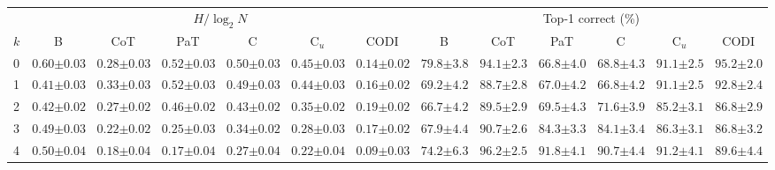 \begin{table}[!t]
\centering
\tiny
\setlength{\tabcolsep}{3pt}
\begin{tabular}{l cccccc cccccc}
\toprule
 & \multicolumn{6}{c}{$H/\log_2 N$} & \multicolumn{6}{c}{Top-1 correct (\%)} \\
\cmidrule(lr){2-7} \cmidrule(lr){8-13}
$k$ & B & CoT & PaT & C & C$_u$ & CODI & B & CoT & PaT & C & C$_u$ & CODI \\
\midrule
0 & $0.60 {\scriptstyle \pm 0.03}$ & $0.28 {\scriptstyle \pm 0.03}$ & $0.52 {\scriptstyle \pm 0.03}$ & $0.50 {\scriptstyle \pm 0.03}$ & $0.45 {\scriptstyle \pm 0.03}$ & $0.14 {\scriptstyle \pm 0.02}$ & $79.8 {\scriptstyle \pm 3.8}$ & $94.1 {\scriptstyle \pm 2.3}$ & $66.8 {\scriptstyle \pm 4.0}$ & $68.8 {\scriptstyle \pm 4.3}$ & $91.1 {\scriptstyle \pm 2.5}$ & $95.2 {\scriptstyle \pm 2.0}$ \\
1 & $0.41 {\scriptstyle \pm 0.03}$ & $0.33 {\scriptstyle \pm 0.03}$ & $0.52 {\scriptstyle \pm 0.03}$ & $0.49 {\scriptstyle \pm 0.03}$ & $0.44 {\scriptstyle \pm 0.03}$ & $0.16 {\scriptstyle \pm 0.02}$ & $69.2 {\scriptstyle \pm 4.2}$ & $88.7 {\scriptstyle \pm 2.8}$ & $67.0 {\scriptstyle \pm 4.2}$ & $66.8 {\scriptstyle \pm 4.2}$ & $91.1 {\scriptstyle \pm 2.5}$ & $92.8 {\scriptstyle \pm 2.4}$ \\
2 & $0.42 {\scriptstyle \pm 0.02}$ & $0.27 {\scriptstyle \pm 0.02}$ & $0.46 {\scriptstyle \pm 0.02}$ & $0.43 {\scriptstyle \pm 0.02}$ & $0.35 {\scriptstyle \pm 0.02}$ & $0.19 {\scriptstyle \pm 0.02}$ & $66.7 {\scriptstyle \pm 4.2}$ & $89.5 {\scriptstyle \pm 2.9}$ & $69.5 {\scriptstyle \pm 4.3}$ & $71.6 {\scriptstyle \pm 3.9}$ & $85.2 {\scriptstyle \pm 3.1}$ & $86.8 {\scriptstyle \pm 2.9}$ \\
3 & $0.49 {\scriptstyle \pm 0.03}$ & $0.22 {\scriptstyle \pm 0.02}$ & $0.25 {\scriptstyle \pm 0.03}$ & $0.34 {\scriptstyle \pm 0.02}$ & $0.28 {\scriptstyle \pm 0.03}$ & $0.17 {\scriptstyle \pm 0.02}$ & $67.9 {\scriptstyle \pm 4.4}$ & $90.7 {\scriptstyle \pm 2.6}$ & $84.3 {\scriptstyle \pm 3.3}$ & $84.1 {\scriptstyle \pm 3.4}$ & $86.3 {\scriptstyle \pm 3.1}$ & $86.8 {\scriptstyle \pm 3.2}$ \\
4 & $0.50 {\scriptstyle \pm 0.04}$ & $0.18 {\scriptstyle \pm 0.04}$ & $0.17 {\scriptstyle \pm 0.04}$ & $0.27 {\scriptstyle \pm 0.04}$ & $0.22 {\scriptstyle \pm 0.04}$ & $0.09 {\scriptstyle \pm 0.03}$ & $74.2 {\scriptstyle \pm 6.3}$ & $96.2 {\scriptstyle \pm 2.5}$ & $91.8 {\scriptstyle \pm 4.1}$ & $90.7 {\scriptstyle \pm 4.4}$ & $91.2 {\scriptstyle \pm 4.1}$ & $89.6 {\scriptstyle \pm 4.4}$ \\

\end{tabular}
\end{table}
